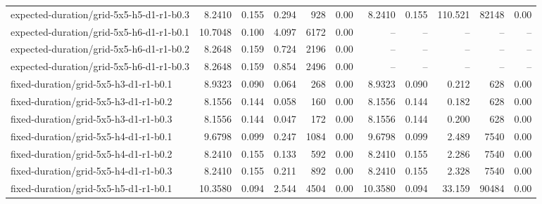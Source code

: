 \documentclass[10pt]{article}
\begin{document}
\begin{tabular}{p{65mm}rrrrrrrrrr}
expected-\allowbreak duration/\allowbreak grid-\allowbreak 5x5-\allowbreak h5-\allowbreak d1-\allowbreak r1-\allowbreak b0.3 & 8.2410 & 0.155 & 0.294 & 928 & 0.00 & 8.2410 & 0.155 & 110.521 & 82148 & 0.00 \\
expected-\allowbreak duration/\allowbreak grid-\allowbreak 5x5-\allowbreak h6-\allowbreak d1-\allowbreak r1-\allowbreak b0.1 & 10.7048 & 0.100 & 4.097 & 6172 & 0.00 & -- & -- & -- & -- & -- \\
expected-\allowbreak duration/\allowbreak grid-\allowbreak 5x5-\allowbreak h6-\allowbreak d1-\allowbreak r1-\allowbreak b0.2 & 8.2648 & 0.159 & 0.724 & 2196 & 0.00 & -- & -- & -- & -- & -- \\
expected-\allowbreak duration/\allowbreak grid-\allowbreak 5x5-\allowbreak h6-\allowbreak d1-\allowbreak r1-\allowbreak b0.3 & 8.2648 & 0.159 & 0.854 & 2496 & 0.00 & -- & -- & -- & -- & -- \\
fixed-\allowbreak duration/\allowbreak grid-\allowbreak 5x5-\allowbreak h3-\allowbreak d1-\allowbreak r1-\allowbreak b0.1 & 8.9323 & 0.090 & 0.064 & 268 & 0.00 & 8.9323 & 0.090 & 0.212 & 628 & 0.00 \\
fixed-\allowbreak duration/\allowbreak grid-\allowbreak 5x5-\allowbreak h3-\allowbreak d1-\allowbreak r1-\allowbreak b0.2 & 8.1556 & 0.144 & 0.058 & 160 & 0.00 & 8.1556 & 0.144 & 0.182 & 628 & 0.00 \\
fixed-\allowbreak duration/\allowbreak grid-\allowbreak 5x5-\allowbreak h3-\allowbreak d1-\allowbreak r1-\allowbreak b0.3 & 8.1556 & 0.144 & 0.047 & 172 & 0.00 & 8.1556 & 0.144 & 0.200 & 628 & 0.00 \\
fixed-\allowbreak duration/\allowbreak grid-\allowbreak 5x5-\allowbreak h4-\allowbreak d1-\allowbreak r1-\allowbreak b0.1 & 9.6798 & 0.099 & 0.247 & 1084 & 0.00 & 9.6798 & 0.099 & 2.489 & 7540 & 0.00 \\
fixed-\allowbreak duration/\allowbreak grid-\allowbreak 5x5-\allowbreak h4-\allowbreak d1-\allowbreak r1-\allowbreak b0.2 & 8.2410 & 0.155 & 0.133 & 592 & 0.00 & 8.2410 & 0.155 & 2.286 & 7540 & 0.00 \\
fixed-\allowbreak duration/\allowbreak grid-\allowbreak 5x5-\allowbreak h4-\allowbreak d1-\allowbreak r1-\allowbreak b0.3 & 8.2410 & 0.155 & 0.211 & 892 & 0.00 & 8.2410 & 0.155 & 2.328 & 7540 & 0.00 \\
fixed-\allowbreak duration/\allowbreak grid-\allowbreak 5x5-\allowbreak h5-\allowbreak d1-\allowbreak r1-\allowbreak b0.1 & 10.3580 & 0.094 & 2.544 & 4504 & 0.00 & 10.3580 & 0.094 & 33.159 & 90484 & 0.00 \\

\end{tabular}
\end{document}
